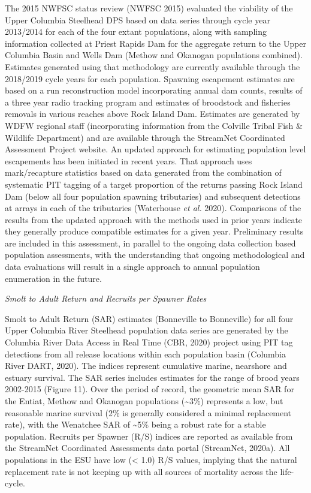 \documentclass[
  letterpaper,
  oneside,
  open=any]{scrbook}
\begin{document}
The 2015 NWFSC status review (NWFSC 2015) evaluated the viability of the
Upper Columbia Steelhead DPS based on data series through cycle year
2013/2014 for each of the four extant populations, along with sampling
information collected at Priest Rapids Dam for the aggregate return to
the Upper Columbia Basin and Wells Dam (Methow and Okanogan populations
combined). Estimates generated using that methodology are currently
available through the 2018/2019 cycle years for each population.
Spawning escapement estimates are based on a run reconstruction model
incorporating annual dam counts, results of a three year radio tracking
program and estimates of broodstock and fisheries removals in various
reaches above Rock Island Dam. Estimates are generated by WDFW regional
staff (incorporating information from the Colville Tribal Fish \&
Wildlife Department) and are available through the StreamNet Coordinated
Assessment Project website. An updated approach for estimating
population level escapements has been initiated in recent years. That
approach uses mark/recapture statistics based on data generated from the
combination of systematic PIT tagging of a target proportion of the
returns passing Rock Island Dam (below all four population spawning
tributaries) and subsequent detections at arrays in each of the
tributaries (Waterhouse \emph{et al.} 2020). Comparisons of the results
from the updated approach with the methods used in prior years indicate
they generally produce compatible estimates for a given year.
Preliminary results are included in this assessment, in parallel to the
ongoing data collection based population assessments, with the
understanding that ongoing methodological and data evaluations will
result in a single approach to annual population enumeration in the
future.

\emph{Smolt to Adult Return and Recruits per Spawner Rates}

Smolt to Adult Return (SAR) estimates (Bonneville to Bonneville) for all
four Upper Columbia River Steelhead population data series are generated
by the Columbia River Data Access in Real Time (CBR, 2020) project using
PIT tag detections from all release locations within each population
basin (Columbia River DART, 2020). The indices represent cumulative
marine, nearshore and estuary survival. The SAR series includes
estimates for the range of brood years 2002-2015 (Figure 11). Over the
period of record, the geometric mean SAR for the Entiat, Methow and
Okanogan populations (\textasciitilde3\%) represents a low, but
reasonable marine survival (2\% is generally considered a minimal
replacement rate), with the Wenatchee SAR of \textasciitilde5\% being a
robust rate for a stable population. Recruits per Spawner (R/S) indices
are reported as available from the StreamNet Coordinated Assessments
data portal (StreamNet, 2020a). All populations in the ESU have low
(\textless{} 1.0) R/S values, implying that the natural replacement rate
is not keeping up with all sources of mortality across the life-cycle.
\end{document}

